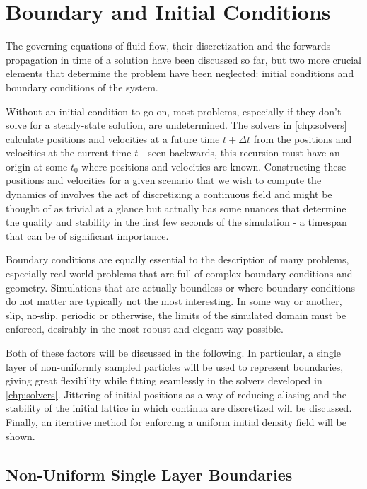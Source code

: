 
\chapter{Boundary and Initial Conditions}\label{chp:boundary-and-initial}
The governing equations of fluid flow, their discretization and the forwards propagation in time of a solution have been discussed so far, but two more crucial elements that determine the problem have been neglected: initial conditions and boundary conditions of the system.

Without an initial condition to go on, most problems, especially if they don't solve for a steady-state solution, are undetermined. The solvers in \autoref{chp:solvers} calculate positions and velocities at a future time $t+\Delta t$ from the positions and velocities at the current time $t$ - seen backwards, this recursion must have an origin at some $t_0$ where positions and velocities are known. Constructing these positions and velocities for a given scenario that we wish to compute the dynamics of involves the act of discretizing a continuous field and might be thought of as trivial at a glance but actually has some nuances that determine the quality and stability in the first few seconds of the simulation - a timespan that can be of significant importance.

Boundary conditions are equally essential to the description of many problems, especially real-world problems that are full of complex boundary conditions and -geometry. Simulations that are actually boundless or where boundary conditions do not matter are typically not the most interesting. In some way or another, slip, no-slip, periodic or otherwise, the limits of the simulated domain must be enforced, desirably in the most robust and elegant way possible.

Both of these factors will be discussed in the following. In particular, a single layer of non-uniformly sampled particles will be used to represent boundaries, giving great flexibility while fitting seamlessly in the solvers developed in \autoref{chp:solvers}. Jittering of initial positions as a way of reducing aliasing and the stability of the initial lattice in which continua are discretized will be discussed. Finally, an iterative method for enforcing a uniform initial density field will be shown.

\section{Non-Uniform Single Layer Boundaries}

